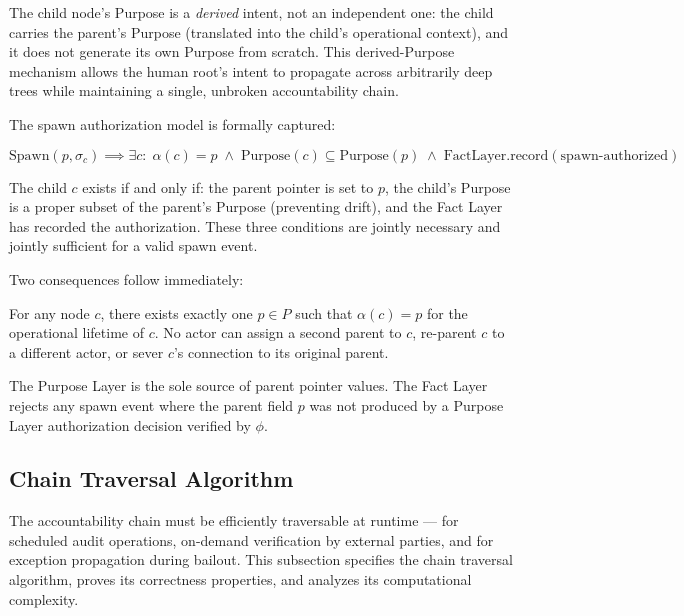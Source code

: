 The child node's Purpose is a \emph{derived} intent, not an independent one: the child carries the parent's Purpose (translated into the child's operational context), and it does not generate its own Purpose from scratch. This derived-Purpose mechanism allows the human root's intent to propagate across arbitrarily deep trees while maintaining a single, unbroken accountability chain.

The spawn authorization model is formally captured:

\begin{equation}
\text{Spawn}(p, \sigma_c) \implies \exists c:\; \alpha(c) = p \;\land\; \text{Purpose}(c) \subseteq \text{Purpose}(p) \;\land\; \text{FactLayer.record}(\text{spawn-authorized})
\tag{SP-1}
\end{equation}

The child $c$ exists if and only if: the parent pointer is set to $p$, the child's Purpose is a proper subset of the parent's Purpose (preventing drift), and the Fact Layer has recorded the authorization. These three conditions are jointly necessary and jointly sufficient for a valid spawn event.

Two consequences follow immediately:

\begin{prop}
\label{prop:single-parent}
For any node $c$, there exists exactly one $p \in P$ such that $\alpha(c) = p$ for the operational lifetime of $c$. No actor can assign a second parent to $c$, re-parent $c$ to a different actor, or sever $c$'s connection to its original parent.
\end{prop}

\begin{prop}
\label{prop:purpose-exclusivity}
The Purpose Layer is the sole source of parent pointer values. The Fact Layer rejects any spawn event where the parent field $p$ was not produced by a Purpose Layer authorization decision verified by $\phi$.
\end{prop}

\subsection{Chain Traversal Algorithm}
\label{sec:chain-traversal}

The accountability chain must be efficiently traversable at runtime — for scheduled audit operations, on-demand verification by external parties, and for exception propagation during bailout. This subsection specifies the chain traversal algorithm, proves its correctness properties, and analyzes its computational complexity.

